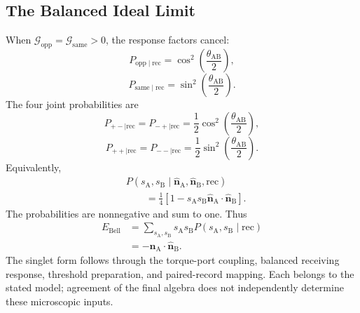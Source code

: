 \subsection{The Balanced Ideal Limit}

When $\mathcal G_{\mathrm{opp}}=\mathcal G_{\mathrm{same}}>0$, the response factors cancel:
\begin{equation}
    \boxed{
    P_{\mathrm{opp}\mid\mathrm{rec}}
    =\cos^2\!\left(\frac{\theta_{\mathrm{AB}}}{2}\right)
    },
    \label{eq:entanglement_probability_opp}
\end{equation}
\begin{equation}
    \boxed{
    P_{\mathrm{same}\mid\mathrm{rec}}
    =\sin^2\!\left(\frac{\theta_{\mathrm{AB}}}{2}\right)
    }.
    \label{eq:entanglement_probability_same}
\end{equation}
The four joint probabilities are
\begin{equation}
    P_{+-\mid\mathrm{rec}}=P_{-+\mid\mathrm{rec}}
    =\frac12\cos^2\!\left(\frac{\theta_{\mathrm{AB}}}{2}\right),
    \label{eq:entanglement_joint_opposite}
\end{equation}
\begin{equation}
    P_{++\mid\mathrm{rec}}=P_{--\mid\mathrm{rec}}
    =\frac12\sin^2\!\left(\frac{\theta_{\mathrm{AB}}}{2}\right).
    \label{eq:entanglement_joint_same}
\end{equation}
Equivalently,
\begin{equation}
    \boxed{
    \begin{aligned}
    &P(s_{\mathrm A},s_{\mathrm B}\mid
       \widehat{\mathbf n}_{\mathrm A},\widehat{\mathbf n}_{\mathrm B},\mathrm{rec})\\
    &\qquad=\frac14
      \left[1-s_{\mathrm A}s_{\mathrm B}
        \widehat{\mathbf n}_{\mathrm A}\cdot\widehat{\mathbf n}_{\mathrm B}\right].
    \end{aligned}
    }
\end{equation}
The probabilities are nonnegative and sum to one. Thus
\begin{equation}
    \boxed{
    \begin{aligned}
    E_{\mathrm{Bell}}
    &=\sum_{s_{\mathrm A},s_{\mathrm B}}s_{\mathrm A}s_{\mathrm B}
        P(s_{\mathrm A},s_{\mathrm B}\mid\mathrm{rec})\\
    &=-\widehat{\mathbf n}_{\mathrm A}\cdot\widehat{\mathbf n}_{\mathrm B}.
    \end{aligned}
    }
    \label{eq:entanglement_singlet_correlation}
\end{equation}
The singlet form follows through the torque-port coupling, balanced receiving response, threshold preparation, and paired-record mapping. Each belongs to the stated model; agreement of the final algebra does not independently determine these microscopic inputs.

